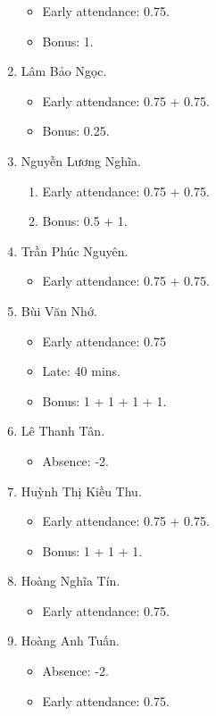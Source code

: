 \documentclass{article}
\begin{document}
\begin{enumerate}
	\begin{itemize}
		\item Early attendance: 0.75.
		\item Bonus: 1.
	\end{itemize}
	\item {\sc Lâm Bảo Ngọc.}
	\begin{itemize}
		\item Early attendance: 0.75 + 0.75.
		\item Bonus: 0.25.
	\end{itemize}	
	\item {\sc Nguyễn Lương Nghĩa.}
	\begin{enumerate}
		\item Early attendance: 0.75 + 0.75.
		\item Bonus: 0.5 + 1.
	\end{enumerate}
	\item {\sc Trần Phúc Nguyên.}
	\begin{itemize}
		\item Early attendance: 0.75 + 0.75.
	\end{itemize}
	\item {\sc Bùi Văn Nhớ}.
	\begin{itemize}
		\item Early attendance: 0.75
		\item Late: 40 mins.
		\item Bonus: 1 + 1 + 1 + 1.	
	\end{itemize}
	\item {\sc Lê Thanh Tân.}
	\begin{itemize}
		\item Absence: -2.
	\end{itemize}
	\item {\sc Huỳnh Thị Kiều Thu.}
	\begin{itemize}
		\item Early attendance: 0.75 + 0.75.
		\item Bonus: 1 + 1 + 1.
	\end{itemize}
	\item {\sc Hoàng Nghĩa Tín.}
	\begin{itemize}
		\item Early attendance: 0.75.
	\end{itemize}
	\item {\sc Hoàng Anh Tuấn.}
	\begin{itemize}
		\item Absence: -2.
		\item Early attendance: 0.75.

\end{itemize}
\end{enumerate}
\end{document}
